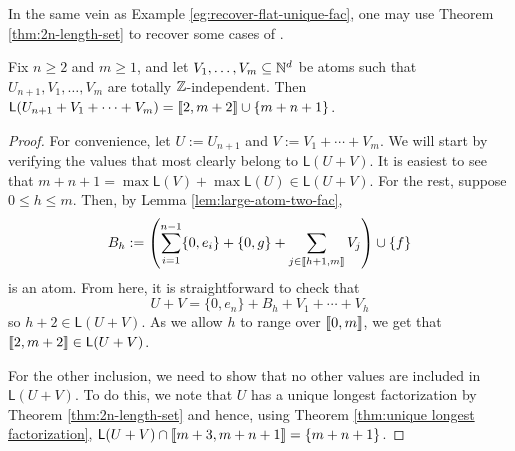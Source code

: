 \begin{rk}
In the same vein as Example \ref{eg:recover-flat-unique-fac}, one may use Theorem \ref{thm:2n-length-set} to recover some cases of \cite[Proposition 4.8]{fan-tringali18}.
\end{rk}


\begin{cor} \label{thm:int-point-construction}
Fix $n\ge 2$ and $m\ge 1$, and let $V_1,\dots, V_m \subseteq \mathbb{N}^d$ be atoms such that $U_{n+1},V_1,\dots, V_m$ are totally $\mathbb{Z}$-independent.
Then $\mathsf{L}(U_{n+1}+V_1+\cdots+V_m) = \llbracket 2,m+2 \rrbracket \cup \{m+n+1\}$.
\end{cor}

\begin{proof}
For convenience, let $U := U_{n+1}$ and $V := V_1 + \cdots + V_m$.
We will start by verifying the values that most clearly belong to $\mathsf{L}(U+V)$.
It is easiest to see that $m+n+1 =\max\mathsf{L}(V)+\max\mathsf{L}(U) \in \mathsf{L}(U+V)$.
For the rest, suppose $0\le h \le m$.
Then, by Lemma \ref{lem:large-atom-two-fac}, 
\[B_h := \left( \sum_{i=1}^{n-1} \{0,e_i\} + \{0,g\} + \sum_{j\in \llbracket h+1,m \rrbracket} V_j \right) \cup \{f\} \]
is an atom.
From here, it is straightforward to check that
\[ U+ V = \{0,e_n\} + B_h + V_1 + \cdots + V_h \]
so $h+2 \in \mathsf{L}(U+V)$.
As we allow $h$ to range over $\llbracket 0,m \rrbracket$, we get that $\llbracket 2,m+2 \rrbracket \in \mathsf{L}(U+V)$.

For the other inclusion, we need to show that no other values are included in $\mathsf{L}(U+V)$.
To do this, we note that $U$ has a unique longest factorization by Theorem \ref{thm:2n-length-set} and hence, using Theorem \ref{thm:unique longest factorization}, $\mathsf{L}(U+V) \cap \llbracket m+3, m+n+1 \rrbracket = \{m+n+1\}$.
\end{proof}








